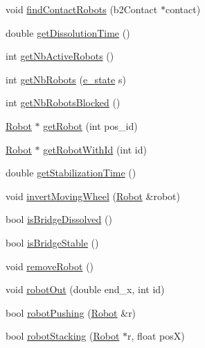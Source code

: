 \begin{DoxyCompactItemize}
\item 
void \mbox{\hyperlink{class_robot_controller_a11e413a1ac6466f360f46820d28b0f2e}{find\+Contact\+Robots}} (b2\+Contact $\ast$contact)
\item 
double \mbox{\hyperlink{class_robot_controller_a55f55b2b3b9013bdfc28ad11e0318ce8}{get\+Dissolution\+Time}} ()
\item 
int \mbox{\hyperlink{class_robot_controller_a45a4e25b2bb49bf2f1dc18b0f21a6f8d}{get\+Nb\+Active\+Robots}} ()
\item 
int \mbox{\hyperlink{class_robot_controller_a612d9355c9638b9f0bb24348647ada45}{get\+Nb\+Robots}} (\mbox{\hyperlink{_robot_8h_a74a75e4700f1f71bb89d80765319e57b}{e\+\_\+state}} s)
\item 
int \mbox{\hyperlink{class_robot_controller_a83a58bbd6f7fbafb3038ec0cb6271fda}{get\+Nb\+Robots\+Blocked}} ()
\item 
\mbox{\hyperlink{class_robot}{Robot}} $\ast$ \mbox{\hyperlink{class_robot_controller_ae421f813b81632c35ec3494717fd0f12}{get\+Robot}} (int pos\+\_\+id)
\item 
\mbox{\hyperlink{class_robot}{Robot}} $\ast$ \mbox{\hyperlink{class_robot_controller_aa247b8c90ab585358f07a18c891c8b31}{get\+Robot\+With\+Id}} (int id)
\item 
double \mbox{\hyperlink{class_robot_controller_acd0a73a62eca471d77a42a0c15964b8e}{get\+Stabilization\+Time}} ()
\item 
void \mbox{\hyperlink{class_robot_controller_a3191cad0cf82d3378aec0512baf2722b}{invert\+Moving\+Wheel}} (\mbox{\hyperlink{class_robot}{Robot}} \&robot)
\item 
bool \mbox{\hyperlink{class_robot_controller_a5f3c279e0082ea8dbfe03fd32d8e42b5}{is\+Bridge\+Dissolved}} ()
\item 
bool \mbox{\hyperlink{class_robot_controller_a05233232614480ea30138101f730a329}{is\+Bridge\+Stable}} ()
\item 
void \mbox{\hyperlink{class_robot_controller_a0774831ed97c92f24d082603e66950b0}{remove\+Robot}} ()
\item 
void \mbox{\hyperlink{class_robot_controller_a68972b0f0f2f033ee0d2d2c849fb38c9}{robot\+Out}} (double end\+\_\+x, int id)
\item 
bool \mbox{\hyperlink{class_robot_controller_a927abf2765cd53b39acf128f318c3fe5}{robot\+Pushing}} (\mbox{\hyperlink{class_robot}{Robot}} \&r)
\item 
bool \mbox{\hyperlink{class_robot_controller_a83d343eb8958d365624d06ac1b0b1b3d}{robot\+Stacking}} (\mbox{\hyperlink{class_robot}{Robot}} $\ast$r, float posX)

\end{DoxyCompactItemize}
